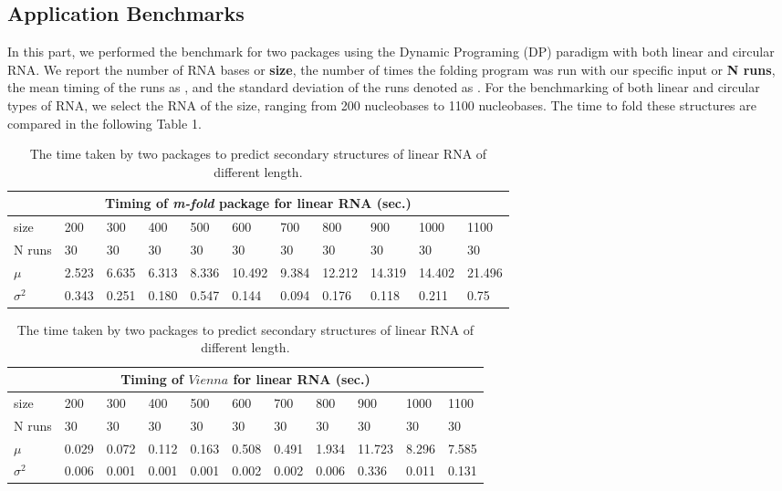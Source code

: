 \documentclass[12pt]{article}
\begin{document}
\subsection{Application Benchmarks}
\par In this part, we performed the benchmark for two packages using the Dynamic Programing (DP) paradigm with
both linear and circular RNA. We report the number of RNA bases or \textbf{size}, the number of times the folding
program was run with our specific input or \textbf{N runs}, the mean timing of the runs as \boldsymbol{$\mu$}, and the standard deviation of the
runs denoted as . For the benchmarking of both linear and circular types of RNA, we select the RNA of the size,
ranging from 200 nucleobases to 1100 nucleobases. The time to fold these structures are compared in the following Table 1.
\begin{table}[h!]
    \begin{tabular}{ |p{1.5cm}||p{1.05cm}|p{1.05cm}|p{1.05cm}|p{1.05cm}|p{1.05cm}|p{1.05cm}|p{1.05cm}| p{1.05cm} | p{1.05cm} | p{1.05cm}| }
    \hline
    \multicolumn{11}{|c|}{Timing of \textit{m-fold} package for linear RNA (sec.)} \\
    \hline
    size& 200& 300& 400& 500& 600& 700 & 800 & 900 & 1000 & 1100\\
    \hline
    N runs& 30 & 30& 30 & 30& 30& 30& 30& 30& 30 & 30\\
    \hline
    $\mu$& 2.523 & 6.635 & 6.313 & 8.336 & 10.492 & 9.384 & 12.212 & 14.319 & 14.402 & 21.496\\
    $\sigma^2$ &0.343 & 0.251 & 0.180 & 0.547 & 0.144 & 0.094 & 0.176 & 0.118 & 0.211 & 0.75 \\
    \hline
    \end{tabular}

    \begin{tabular}{ |p{1.5cm}||p{1.05cm}|p{1.05cm}|p{1.05cm}|p{1.05cm}|p{1.05cm}|p{1.05cm}|p{1.05cm}| p{1.05cm} | p{1.05cm} | p{1.05cm} | }
    \hline
    \multicolumn{11}{|c|}{Timing of $Vienna$ for linear RNA (sec.)} \\
    \hline
    size& 200& 300& 400& 500& 600& 700 & 800 & 900 & 1000 & 1100\\
    \hline
    N runs& 30 & 30& 30 & 30& 30& 30& 30& 30& 30 & 30\\
    \hline
    $\mu$& 0.029 & 0.072 & 0.112 & 0.163 & 0.508 & 0.491 & 1.934 & 11.723 & 8.296 & 7.585 \\
    $\sigma^2$ &0.006 & 0.001 & 0.001 & 0.001 & 0.002 & 0.002 & 0.006 & 0.336 & 0.011 & 0.131 \\
    \hline
    \end{tabular}
\caption{The time taken by two packages to predict secondary structures of linear RNA of different length.}
\end{table}
\end{document}
